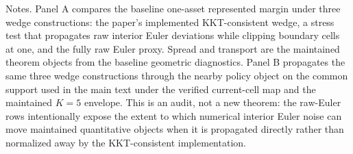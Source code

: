 \begin{table}[t]
\centering
\caption{Wedge-enforcement audit at $\rho^{S}=r$}
\label{tab:wedge-audit}
\footnotesize
\renewcommand{\arraystretch}{1.08}
\begin{minipage}{0.99\textwidth}
\footnotesize Notes. Panel A compares the baseline one-asset represented margin under three wedge constructions: the paper's implemented KKT-consistent wedge, a stress test that propagates raw interior Euler deviations while clipping boundary cells at one, and the fully raw Euler proxy. Spread and transport are the maintained theorem objects from the baseline geometric diagnostics. Panel B propagates the same three wedge constructions through the nearby policy object on the common support used in the main text under the verified current-cell map and the maintained $K=5$ envelope. This is an audit, not a new theorem: the raw-Euler rows intentionally expose the extent to which numerical interior Euler noise can move maintained quantitative objects when it is propagated directly rather than normalized away by the KKT-consistent implementation.
\end{minipage}
\end{table}
